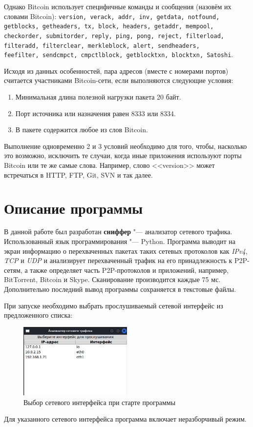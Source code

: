 \documentclass[bachelor, och, coursework]{SCWorks}
\begin{document}
Однако Bitcoin использует специфичные команды и сообщения (назовём их словами Bitcoin): 
\texttt{version, verack, addr, inv, getdata, notfound, getblocks, getheaders, tx,  
block, headers, getaddr, mempool, \\ checkorder, submitorder, reply, ping, pong, reject, 
filterload, \\ filteradd, filterclear, merkleblock, alert, sendheaders, \\ feefilter,
sendcmpct, cmpctlblock, getblocktxn, blocktxn, Satoshi}.

Исходя из данных особенностей, пара адресов (вместе с номерами портов) считается участниками Bitcoin-сети, если выполняются следующие условия:
\begin{enumerate}
    \item Минимальная длина полезной нагрузки пакета 20 байт.
    \item Порт источника или назначения равен 8333 или 8334.
    \item В пакете содержится любое из слов Bitcoin.
\end{enumerate}

Выполнение одновременно 2 и 3 условий необходимо для того, чтобы, насколько это возможно, исключить те случаи, когда иные приложения используют порты Bitcoin или те же самые слова. Например, слово <<version>> может встречаться в HTTP, FTP, Git, SVN и так далее.

\section{Описание программы}
В данной работе был разработан \textbf{сниффер} "--- анализатор сетевого трафика. Использованный язык программирования "--- Python.
Программа выводит на экран информацию о перехваченных пакетах таких сетевых протоколов как \textit{IPv4}, \textit{TCP} и \textit{UDP} и анализирует перехваченный трафик на его принадлежность к P2P-сетям, а также определяет часть P2P-протоколов и приложений, например, BitTorrent, Bitcoin и Skype. Сканирование производится каждые 75 мс.
Дополнительно последний вывод программы сохраняется в текстовые файлы.

При запуске необходимо выбрать прослушиваемый сетевой интерфейс из предложенного списка:
\begin{figure}[H]
    \centering
    \includegraphics[width=0.5\textwidth]{ifaces.png}
    \caption{Выбор сетевого интерфейса при старте программы}
\end{figure}
Для указанного сетевого интерфейса программа включает неразборчивый режим.
\end{document}
